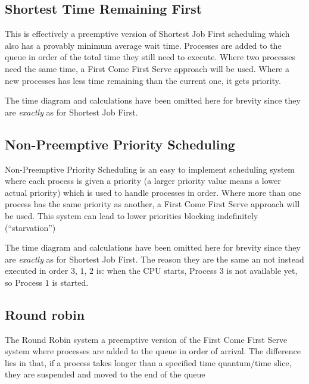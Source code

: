\subsection{Shortest Time Remaining First}\label{sub:shortest_time_remaining_first}

This is effectively a preemptive version of Shortest Job First scheduling which also has a provably minimum average wait time.
Processes are added to the queue in order of the total time they still need to execute.
Where two processes need the same time, a First Come First Serve approach will be used.
Where a new processes has less time remaining than the current one, it gets priority.

\begin{note}
    The time diagram and calculations have been omitted here for brevity since they are \emph{exactly} as for Shortest Job First.
\end{note}

\subsection{Non-Preemptive Priority Scheduling}\label{sub:non_preemptive_priority_scheduling}

Non-Preemptive Priority Scheduling is an easy to implement scheduling system where each process is given a priority (a larger priority value means a lower actual priority) which is used to handle processes in order.
Where more than one process has the same priority as another, a First Come First Serve approach will be used.
This system can lead to lower priorities blocking indefinitely (``starvation'')

\begin{note}
    The time diagram and calculations have been omitted here for brevity since they are \emph{exactly} as for Shortest Job First.
    The reason they are the same an not instead executed in order \(3\), \(1\), \(2\) is: when the CPU starts, Process \(3\) is not available yet, so Process \(1\) is started.
\end{note}

\subsection{Round robin}\label{sub:round_robin}

The Round Robin system a preemptive version of the First Come First Serve system where processes are added to the queue in order of arrival.
The difference lies in that, if a process takes longer than a specified time quantum/time slice, they are suspended and moved to the end of the queue

